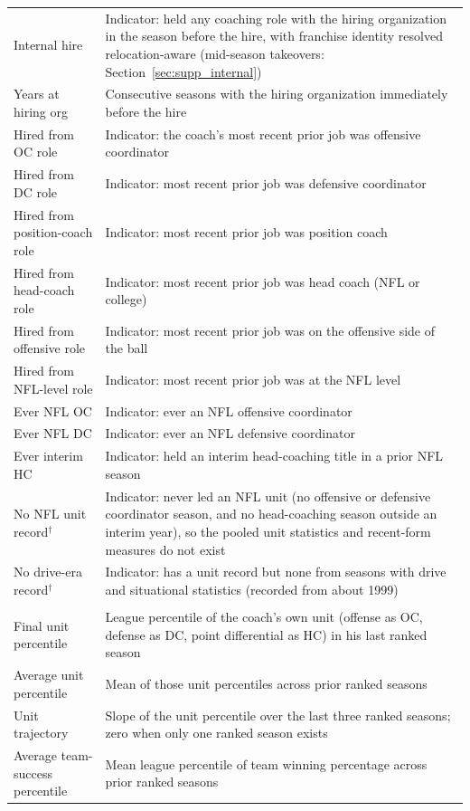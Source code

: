 \documentclass[12pt,USenglish]{article}
\begin{document}
{\begin{longtable}{@{}l p{8.8cm}@{}}
Internal hire & Indicator: held any coaching role with the hiring organization in the season before the hire, with franchise identity resolved relocation-aware (mid-season takeovers: Section~\ref{sec:supp_internal}) \\
Years at hiring org & Consecutive seasons with the hiring organization immediately before the hire \\
Hired from OC role & Indicator: the coach's most recent prior job was offensive coordinator \\
Hired from DC role & Indicator: most recent prior job was defensive coordinator \\
Hired from position-coach role & Indicator: most recent prior job was position coach \\
Hired from head-coach role & Indicator: most recent prior job was head coach (NFL or college) \\
Hired from offensive role & Indicator: most recent prior job was on the offensive side of the ball \\
Hired from NFL-level role & Indicator: most recent prior job was at the NFL level \\
Ever NFL OC & Indicator: ever an NFL offensive coordinator \\
Ever NFL DC & Indicator: ever an NFL defensive coordinator \\
Ever interim HC & Indicator: held an interim head-coaching title in a prior NFL season \\
No NFL unit record$^{\dagger}$ & Indicator: never led an NFL unit (no offensive or defensive coordinator season, and no head-coaching season outside an interim year), so the pooled unit statistics and recent-form measures do not exist \\
No drive-era record$^{\dagger}$ & Indicator: has a unit record but none from seasons with drive and situational statistics (recorded from about 1999) \\
\addlinespace
\multicolumn{2}{@{}l}{\emph{Recent form (6)}}\\[2pt]
Final unit percentile & League percentile of the coach's own unit (offense as OC, defense as DC, point differential as HC) in his last ranked season \\
Average unit percentile & Mean of those unit percentiles across prior ranked seasons \\
Unit trajectory & Slope of the unit percentile over the last three ranked seasons; zero when only one ranked season exists \\
Average team-success percentile & Mean league percentile of team winning percentage across prior ranked seasons \\

\end{longtable}}
\end{document}
